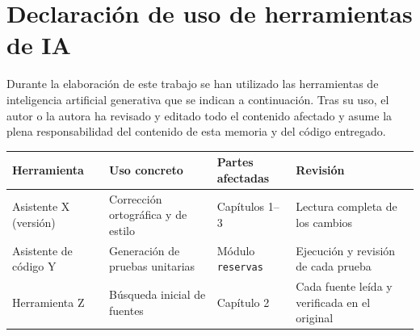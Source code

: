 \chapter*{Declaración de uso de herramientas de IA}

Durante la elaboración de este trabajo se han utilizado las herramientas de
inteligencia artificial generativa que se indican a continuación. Tras su uso,
el autor o la autora ha revisado y editado todo el contenido afectado y asume la
plena responsabilidad del contenido de esta memoria y del código entregado.

\begin{center}
  \small
  \begin{tabularx}{\textwidth}{@{}>{\raggedright\arraybackslash}p{2.6cm}LL>{\raggedright\arraybackslash}p{3.2cm}@{}}
    \toprule
    \textbf{Herramienta} & \textbf{Uso concreto} & \textbf{Partes afectadas} & \textbf{Revisión} \\
    \midrule
    Asistente X (versión) & Corrección ortográfica y de estilo & Capítulos 1--3 & Lectura completa de los cambios \\
    Asistente de código Y & Generación de pruebas unitarias & Módulo \texttt{reservas} & Ejecución y revisión de cada prueba \\
    Herramienta Z & Búsqueda inicial de fuentes & Capítulo 2 & Cada fuente leída y verificada en el original \\
    \bottomrule
  \end{tabularx}
\end{center}


\cleardoublepage

